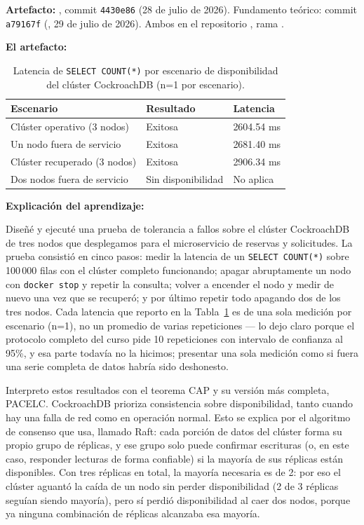 \documentclass[10pt,journal,a4paper]{IEEEtran}
\begin{document}
\textbf{Artefacto:} , commit
\texttt{4430e86} (28 de julio de 2026). Fundamento teórico: commit \texttt{a79167f}
(, 29 de julio de 2026). Ambos en el repositorio
, rama .

\textbf{El artefacto:}

\begin{table}[h]
\centering
\caption{Latencia de \texttt{SELECT COUNT(*)} por escenario de disponibilidad
del clúster CockroachDB (n=1 por escenario).}
\label{tab:latencias}
\small
\begin{tabular}{p{2.1cm}p{1.6cm}p{1.3cm}}
\toprule
\textbf{Escenario} & \textbf{Resultado} & \textbf{Latencia} \\
\midrule
Clúster operativo (3 nodos) & Exitosa & 2604.54 ms \\
Un nodo fuera de servicio & Exitosa & 2681.40 ms \\
Clúster recuperado (3 nodos) & Exitosa & 2906.34 ms \\
Dos nodos fuera de servicio & Sin disponibilidad & No aplica \\
\bottomrule
\end{tabular}
\end{table}

\textbf{Explicación del aprendizaje:}

Diseñé y ejecuté una prueba de tolerancia a fallos sobre el clúster CockroachDB
de tres nodos que desplegamos para el microservicio de reservas y solicitudes.
La prueba consistió en cinco pasos: medir la latencia de un
\texttt{SELECT COUNT(*)} sobre 100\,000 filas con el clúster completo
funcionando; apagar abruptamente un nodo con \texttt{docker stop} y repetir la
consulta; volver a encender el nodo y medir de nuevo una vez que se recuperó;
y por último repetir todo apagando dos de los tres nodos. Cada latencia que
reporto en la Tabla~\ref{tab:latencias} es de una sola medición por escenario
(n=1), no un promedio de varias repeticiones --- lo dejo claro porque el
protocolo completo del curso pide 10 repeticiones con intervalo de confianza
al 95\%, y esa parte todavía no la hicimos; presentar una sola medición como
si fuera una serie completa de datos habría sido deshonesto.

Interpreto estos resultados con el teorema CAP y su versión más completa,
PACELC. CockroachDB prioriza consistencia sobre disponibilidad, tanto cuando
hay una falla de red como en operación normal. Esto se explica por el
algoritmo de consenso que usa, llamado Raft: cada porción de datos del clúster
forma su propio grupo de réplicas, y ese grupo solo puede confirmar escrituras
(o, en este caso, responder lecturas de forma confiable) si la mayoría de sus
réplicas están disponibles. Con tres réplicas en total, la mayoría necesaria
es de 2: por eso el clúster aguantó la caída de un nodo sin perder
disponibilidad (2 de 3 réplicas seguían siendo mayoría), pero sí perdió
disponibilidad al caer dos nodos, porque ya ninguna combinación de réplicas
alcanzaba esa mayoría.
\end{document}
